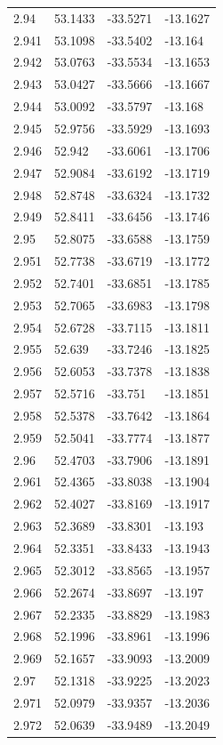\begin{tabular}{llll}
2.94 & 53.1433 & -33.5271 & -13.1627 \\
2.941 & 53.1098 & -33.5402 & -13.164 \\
2.942 & 53.0763 & -33.5534 & -13.1653 \\
2.943 & 53.0427 & -33.5666 & -13.1667 \\
2.944 & 53.0092 & -33.5797 & -13.168 \\
2.945 & 52.9756 & -33.5929 & -13.1693 \\
2.946 & 52.942 & -33.6061 & -13.1706 \\
2.947 & 52.9084 & -33.6192 & -13.1719 \\
2.948 & 52.8748 & -33.6324 & -13.1732 \\
2.949 & 52.8411 & -33.6456 & -13.1746 \\
2.95 & 52.8075 & -33.6588 & -13.1759 \\
2.951 & 52.7738 & -33.6719 & -13.1772 \\
2.952 & 52.7401 & -33.6851 & -13.1785 \\
2.953 & 52.7065 & -33.6983 & -13.1798 \\
2.954 & 52.6728 & -33.7115 & -13.1811 \\
2.955 & 52.639 & -33.7246 & -13.1825 \\
2.956 & 52.6053 & -33.7378 & -13.1838 \\
2.957 & 52.5716 & -33.751 & -13.1851 \\
2.958 & 52.5378 & -33.7642 & -13.1864 \\
2.959 & 52.5041 & -33.7774 & -13.1877 \\
2.96 & 52.4703 & -33.7906 & -13.1891 \\
2.961 & 52.4365 & -33.8038 & -13.1904 \\
2.962 & 52.4027 & -33.8169 & -13.1917 \\
2.963 & 52.3689 & -33.8301 & -13.193 \\
2.964 & 52.3351 & -33.8433 & -13.1943 \\
2.965 & 52.3012 & -33.8565 & -13.1957 \\
2.966 & 52.2674 & -33.8697 & -13.197 \\
2.967 & 52.2335 & -33.8829 & -13.1983 \\
2.968 & 52.1996 & -33.8961 & -13.1996 \\
2.969 & 52.1657 & -33.9093 & -13.2009 \\
2.97 & 52.1318 & -33.9225 & -13.2023 \\
2.971 & 52.0979 & -33.9357 & -13.2036 \\
2.972 & 52.0639 & -33.9489 & -13.2049 \\

\end{tabular}
